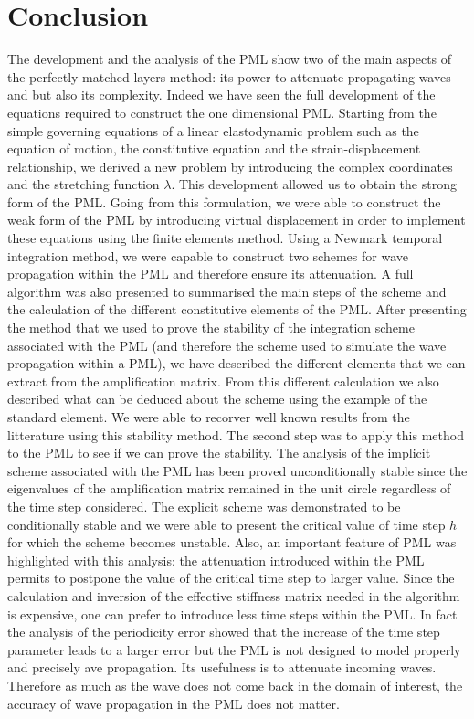 \section*{Conclusion}

The development and the analysis of the PML show two of the main aspects of the perfectly matched layers method: its power to attenuate propagating waves and but also its complexity. 
Indeed we have seen the full development of the equations required to construct the one dimensional PML. Starting from the simple governing equations of a linear elastodynamic problem such as the equation of motion, the constitutive equation and the strain-displacement relationship, we derived a new problem by introducing the complex coordinates and the stretching function $\lambda$. This development allowed us to obtain the strong form of the PML. Going from this formulation, we were able to construct the weak form of the PML by introducing virtual displacement in order to implement these equations using the finite elements method. Using a Newmark temporal integration method, we were capable to construct two schemes for wave propagation within the PML and therefore ensure its attenuation. A full algorithm was also presented to summarised the main steps of the scheme and the calculation of the different constitutive elements of the PML.
After presenting the method that we used to prove the stability of the integration scheme associated with the PML (and therefore the scheme used to simulate the wave propagation within a PML), we have described the different elements that we can extract from the amplification matrix. From this different calculation we also described what can be deduced about the scheme using the example of the standard element. We were able to recorver well known results from the litterature using this stability method. The second step was to apply this method to the PML to see if we can prove the stability. 
The analysis of the implicit scheme associated with the PML has been proved unconditionally stable since the eigenvalues of the amplification matrix remained in the unit circle regardless of the time step considered. The explicit scheme was demonstrated to be conditionally stable and we were able to present the critical value of time step $h$ for which the scheme becomes unstable. Also, an important feature of PML was highlighted with this analysis: the attenuation introduced within the PML permits to postpone the value of the critical time step to larger value. Since the calculation and inversion of the effective stiffness matrix needed in the algorithm is expensive, one can prefer to introduce less time steps within the PML. In fact the analysis of the periodicity error showed that the increase of the time step parameter leads to a larger error but the PML is not designed to model properly and precisely ave propagation. Its usefulness is to attenuate incoming waves. Therefore as much as the wave does not come back in the domain of interest, the accuracy of wave propagation in the PML does not matter.\\

